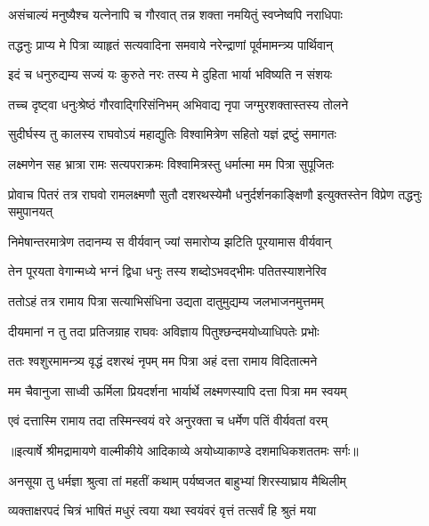 \twolineshloka
{असंचाल्यं मनुष्यैश्च यत्नेनापि च गौरवात्}
{तन्न शक्ता नमयितुं स्वप्नेष्वपि नराधिपाः} %

\twolineshloka
{तद्धनुः प्राप्य मे पित्रा व्याहृतं सत्यवादिना}
{समवाये नरेन्द्राणां पूर्वमामन्त्र्य पार्थिवान्} %

\twolineshloka
{इदं च धनुरुद्यम्य सज्यं यः कुरुते नरः}
{तस्य मे दुहिता भार्या भविष्यति न संशयः} %

\twolineshloka
{तच्च दृष्ट्वा धनुःश्रेष्ठं गौरवाद्गिरिसंनिभम्}
{अभिवाद्य नृपा जग्मुरशक्तास्तस्य तोलने} %

\twolineshloka
{सुदीर्घस्य तु कालस्य राघवोऽयं महाद्युतिः}
{विश्वामित्रेण सहितो यज्ञं द्रष्टुं समागतः} %

\twolineshloka
{लक्ष्मणेन सह भ्रात्रा रामः सत्यपराक्रमः}
{विश्वामित्रस्तु धर्मात्मा मम पित्रा सुपूजितः} %

\threelineshloka
{प्रोवाच पितरं तत्र राघवो रामलक्ष्मणौ}
{सुतौ दशरथस्येमौ धनुर्दर्शनकाङ्क्षिणौ}
{इत्युक्तस्तेन विप्रेण तद्धनुः समुपानयत्} %

\twolineshloka
{निमेषान्तरमात्रेण तदानम्य स वीर्यवान्}
{ज्यां समारोप्य झटिति पूरयामास वीर्यवान्} %

\twolineshloka
{तेन पूरयता वेगान्मध्ये भग्नं द्विधा धनुः}
{तस्य शब्दोऽभवद्भीमः पतितस्याशनेरिव} %

\twolineshloka
{ततोऽहं तत्र रामाय पित्रा सत्याभिसंधिना}
{उद्यता दातुमुद्यम्य जलभाजनमुत्तमम्} %

\twolineshloka
{दीयमानां न तु तदा प्रतिजग्राह राघवः}
{अविज्ञाय पितुश्छन्दमयोध्याधिपतेः प्रभोः} %

\twolineshloka
{ततः श्वशुरमामन्त्र्य वृद्धं दशरथं नृपम्}
{मम पित्रा अहं दत्ता रामाय विदितात्मने} %

\twolineshloka
{मम चैवानुजा साध्वी ऊर्मिला प्रियदर्शना}
{भार्यार्थे लक्ष्मणस्यापि दत्ता पित्रा मम स्वयम्} %

\twolineshloka
{एवं दत्तास्मि रामाय तदा तस्मिन्स्वयं वरे}
{अनुरक्ता च धर्मेण पतिं वीर्यवतां वरम्} %


{॥इत्यार्षे श्रीमद्रामायणे वाल्मीकीये आदिकाव्ये अयोध्याकाण्डे दशमाधिकशततमः सर्गः॥}


\twolineshloka
{अनसूया तु धर्मज्ञा श्रुत्वा तां महतीं कथाम्}
{पर्यष्वजत बाहुभ्यां शिरस्याघ्राय मैथिलीम्} %

\twolineshloka
{व्यक्ताक्षरपदं चित्रं भाषितं मधुरं त्वया}
{यथा स्वयंवरं वृत्तं तत्सर्वं हि श्रुतं मया} %

